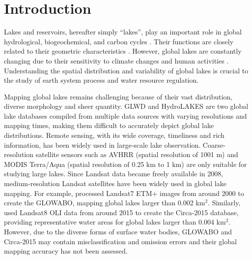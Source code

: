 \documentclass[preprint,12pt,authoryear]{elsarticle}
\begin{document}

\section{Introduction}
\label{sec1}
Lakes and reservoirs, hereafter simply “lakes”, play an important role in global hydrological, biogeochemical, and carbon cycles \citep{lehner_development_2004}. Their functions are closely related to their geometric characteristics \citep{messager_estimating_2016}. However, global lakes are constantly changing due to their sensitivity to climate changes and human activities \citep{williamson_lakes_2009,pi_mapping_2022}. Understanding the spatial distribution and variability of global lakes is crucial to the study of earth system process and water resource regulation. 

Mapping global lakes remains challenging because of their vast distribution, diverse morphology and sheer quantity. GLWD \citep{lehner_development_2004} and HydroLAKES \citep{messager_estimating_2016} are two global lake databases compiled from multiple data sources with varying resolutions and mapping times, making them difficult to accurately depict global lake distributions. Remote sensing, with its wide coverage, timeliness and rich information, has been widely used in large-scale lake observation. Coarse-resolution satellite sensors such as AVHRR (spatial resolution of 1001 m) and MODIS Terra/Aqua (spatial resolution of 0.25 km to 1 km) are only suitable for studying large lakes. Since Landsat data became freely available in 2008, medium-resolution Landsat satellites have been widely used in global lake mapping. For example, \citet{verpoorter_global_2014} processed Landsat7 ETM+ images from around 2000 to create the GLOWABO, mapping global lakes larger than 0.002 km$^2$. Similarly, \citet{sheng_representative_2016} used Landsat8 OLI data from around 2015 to create the Circa-2015 database, providing representative water areas for global lakes larger than 0.004 km$^2$. However, due to the diverse forms of surface water bodies, GLOWABO and Circa-2015 may contain misclassification and omission errors and their global mapping accuracy has not been assessed.
\end{document}
